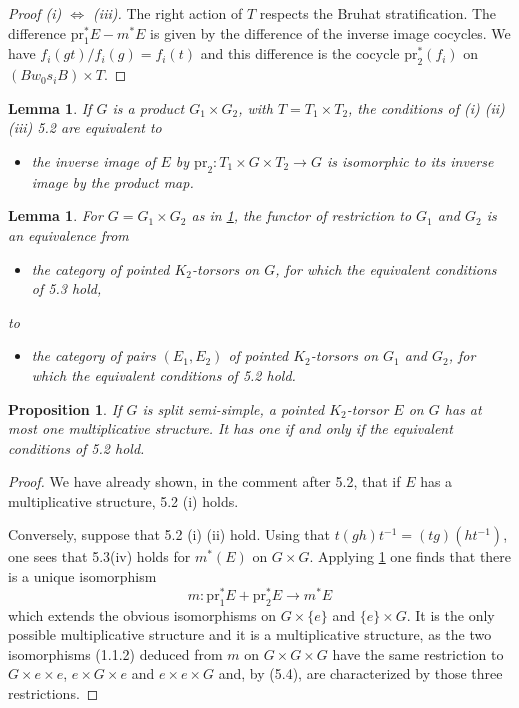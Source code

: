 \documentclass[11pt,a4paper]{article}
\theoremstyle{plain}
\newtheorem{lemma}[theorem]{Lemma}
\newtheorem{proposition}[theorem]{Proposition}
\theoremstyle{definition}
\newcommand{\pr}{\mathrm{pr}}
\begin{document}
\begin{proof}[Proof (i) $\Leftrightarrow$ (iii)]
The right action of $T$ respects the Bruhat stratification. The difference $\pr_1^* E - m^* E$ is given by the difference of the inverse image cocycles. We have $f_i(gt)/f_i(g) = f_i(t)$ and this difference is the cocycle $\pr_2^*(f_i)$ on $(Bw_0 s_i B) \times T$.
\end{proof}

\begin{lemma}\label{lem:5.3}
If $G$ is a product $G_1 \times G_2$, with $T = T_1 \times T_2$, the conditions of (i) (ii) (iii) 5.2 are equivalent to
\begin{itemize}
\item[(iv)] the inverse image of $E$ by $\pr_2: T_1 \times G \times T_2 \to G$ is isomorphic to its inverse image by the product map.
\end{itemize}
\end{lemma}

\begin{lemma}\label{lem:5.4}
For $G = G_1 \times G_2$ as in \ref{lem:5.3}, the functor of restriction to $G_1$ and $G_2$ is an equivalence from
\begin{itemize}
\item[(i)] the category of pointed $K_2$-torsors on $G$, for which the equivalent conditions of 5.3 hold,
\end{itemize}
to
\begin{itemize}
\item[(ii)] the category of pairs $(E_1, E_2)$ of pointed $K_2$-torsors on $G_1$ and $G_2$, for which the equivalent conditions of 5.2 hold.
\end{itemize}
\end{lemma}

\begin{proposition}\label{prop:5.5}
If $G$ is split semi-simple, a pointed $K_2$-torsor $E$ on $G$ has at most one multiplicative structure. It has one if and only if the equivalent conditions of 5.2 hold.
\end{proposition}

\begin{proof}
We have already shown, in the comment after 5.2, that if $E$ has a multiplicative structure, 5.2 (i) holds.

Conversely, suppose that 5.2 (i) (ii) hold. Using that $t(gh)t^{-1} = (tg)(ht^{-1})$, one sees that 5.3(iv) holds for $m^*(E)$ on $G \times G$. Applying \ref{lem:5.4} one finds that there is a unique isomorphism
\[m: \pr_1^* E + \pr_2^* E \to m^* E\]
which extends the obvious isomorphisms on $G \times \{e\}$ and $\{e\} \times G$. It is the only possible multiplicative structure and it is a multiplicative structure, as the two isomorphisms (1.1.2) deduced from $m$ on $G \times G \times G$ have the same restriction to $G \times e \times e$, $e \times G \times e$ and $e \times e \times G$ and, by (5.4), are characterized by those three restrictions.
\end{proof}
\end{document}
